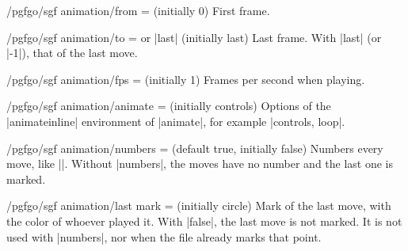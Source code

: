\begin{codeexample}[width=5cm]
\end{codeexample}

\begin{key}{/pgfgo/sgf animation/from =  (initially 0)}
	First frame.
\end{key}

\begin{key}{/pgfgo/sgf animation/to =  or |last| (initially last)}
	Last frame. With |last| (or |-1|), that of the last move.
\end{key}

\begin{key}{/pgfgo/sgf animation/fps =  (initially 1)}
	Frames per second when playing.
\end{key}


\begin{key}{/pgfgo/sgf animation/animate =  (initially controls)}
	Options of the |animateinline| environment of |animate|, for example |controls, loop|.
\end{key}

\begin{key}{/pgfgo/sgf animation/numbers =  (default true, initially false)}
	Numbers every move, like |\sgf|. Without |numbers|, the moves have no number and the last one is marked.

	\begin{codeexample}[width=5cm]
	\end{codeexample}
\end{key}

\begin{key}{/pgfgo/sgf animation/last mark =  (initially circle)}
	Mark of the last move, with the color of whoever played it. With |false|, the last move is not marked. It is not used with |numbers|, nor when the file already marks that point.

	\begin{codeexample}[width=5cm]
	\end{codeexample}
\end{key}


